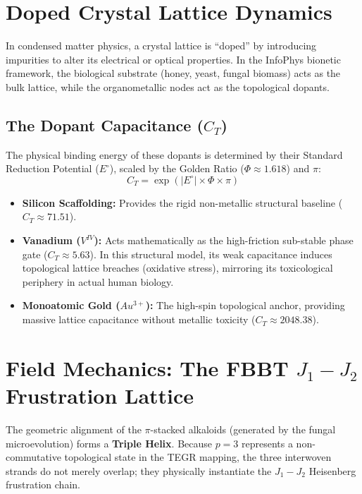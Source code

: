 \documentclass[12pt,oneside]{article}
\theoremstyle{principia}
\theoremstyle{definition}
\theoremstyle{remark}
\begin{document}
\section{Doped Crystal Lattice Dynamics}

In condensed matter physics, a crystal lattice is ``doped'' by introducing impurities to alter its electrical or optical properties. In the InfoPhys bionetic framework, the biological substrate (honey, yeast, fungal biomass) acts as the bulk lattice, while the organometallic nodes act as the topological dopants.

\subsection{The Dopant Capacitance ($C_T$)}
The physical binding energy of these dopants is determined by their Standard Reduction Potential ($E^\circ$), scaled by the Golden Ratio ($\Phi \approx 1.618$) and $\pi$:
\begin{equation}
    C_T = \exp(|E^\circ| \times \Phi \times \pi)
\end{equation}

\begin{itemize}
    \item \textbf{Silicon Scaffolding:} Provides the rigid non-metallic structural baseline ($C_T \approx 71.51$).
    \item \textbf{Vanadium ($V^{IV}$):} Acts mathematically as the high-friction sub-stable phase gate ($C_T \approx 5.63$). In this structural model, its weak capacitance induces topological lattice breaches (oxidative stress), mirroring its toxicological periphery in actual human biology.
    \item \textbf{Monoatomic Gold ($Au^{3+}$):} The high-spin topological anchor, providing massive lattice capacitance without metallic toxicity ($C_T \approx 2048.38$).
\end{itemize}

\section{Field Mechanics: The FBBT $J_1-J_2$ Frustration Lattice}

The geometric alignment of the $\pi$-stacked alkaloids (generated by the fungal microevolution) forms a \textbf{Triple Helix}. Because $p=3$ represents a non-commutative topological state in the TEGR mapping, the three interwoven strands do not merely overlap; they physically instantiate the $J_1-J_2$ Heisenberg frustration chain. 
\end{document}

